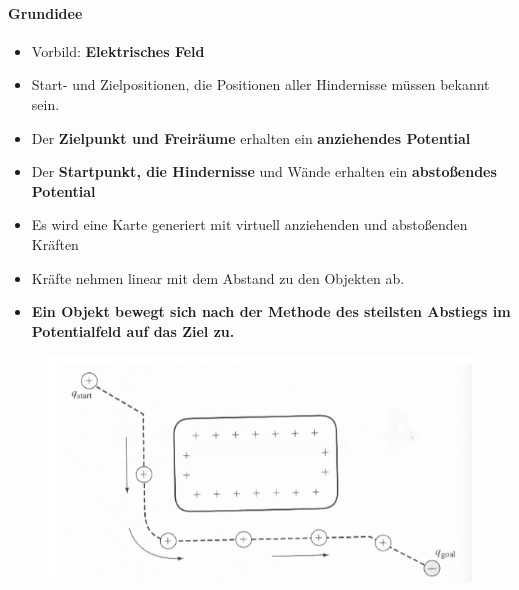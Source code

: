 \paragraph{Grundidee}
\begin{itemize}
	\item Vorbild: \textbf{Elektrisches Feld}
	\item Start- und Zielpositionen, die Positionen aller Hindernisse müssen bekannt sein.
	\item Der \textbf{Zielpunkt und Freiräume} erhalten ein \textbf{anziehendes Potential}
	\item Der \textbf{Startpunkt, die Hindernisse} und Wände erhalten ein \textbf{abstoßendes Potential}
	\item Es wird eine Karte generiert mit virtuell anziehenden und abstoßenden Kräften
	\item Kräfte nehmen linear mit dem Abstand zu den Objekten ab.
	\item \textbf{Ein Objekt bewegt sich nach der Methode des steilsten Abstiegs im Potentialfeld auf das Ziel zu.}
\end{itemize}
\begin{figure}[H]
	\begin{center}
		\includegraphics[scale=0.5]{Resources/PNG/Potentialfeld.PNG}
		\caption{}
		\label{fig:PNG/Potentialfeld.PNG}
	\end{center}
\end{figure}